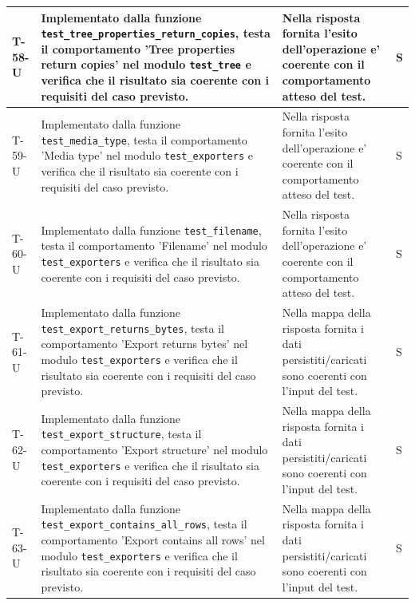 \documentclass[a4paper,12pt]{article}
\begin{document}
{{\begin{longtable}{|>{\RaggedRight\arraybackslash}p{1.55cm}|>{\RaggedRight\arraybackslash}p{8.0cm}|>{\RaggedRight\arraybackslash}p{4.6cm}|>{\RaggedRight\arraybackslash}p{1.2cm}|}
        \hline
        T-58-U & Implementato dalla funzione \texttt{test\_\allowbreak tree\_\allowbreak properties\_\allowbreak return\_\allowbreak copies}, testa il comportamento 'Tree properties return copies' nel modulo \texttt{test\_\allowbreak tree} e verifica che il risultato sia coerente con i requisiti del caso previsto. & Nella risposta fornita l'esito dell'operazione e' coerente con il comportamento atteso del test. & S \\
        \hline
        T-59-U & Implementato dalla funzione \texttt{test\_\allowbreak media\_\allowbreak type}, testa il comportamento 'Media type' nel modulo \texttt{test\_\allowbreak exporters} e verifica che il risultato sia coerente con i requisiti del caso previsto. & Nella risposta fornita l'esito dell'operazione e' coerente con il comportamento atteso del test. & S \\
        \hline
        T-60-U & Implementato dalla funzione \texttt{test\_\allowbreak filename}, testa il comportamento 'Filename' nel modulo \texttt{test\_\allowbreak exporters} e verifica che il risultato sia coerente con i requisiti del caso previsto. & Nella risposta fornita l'esito dell'operazione e' coerente con il comportamento atteso del test. & S \\
        \hline
        T-61-U & Implementato dalla funzione \texttt{test\_\allowbreak export\_\allowbreak returns\_\allowbreak bytes}, testa il comportamento 'Export returns bytes' nel modulo \texttt{test\_\allowbreak exporters} e verifica che il risultato sia coerente con i requisiti del caso previsto. & Nella mappa della risposta fornita i dati persistiti/caricati sono coerenti con l'input del test. & S \\
        \hline
        T-62-U & Implementato dalla funzione \texttt{test\_\allowbreak export\_\allowbreak structure}, testa il comportamento 'Export structure' nel modulo \texttt{test\_\allowbreak exporters} e verifica che il risultato sia coerente con i requisiti del caso previsto. & Nella mappa della risposta fornita i dati persistiti/caricati sono coerenti con l'input del test. & S \\
        \hline
        T-63-U & Implementato dalla funzione \texttt{test\_\allowbreak export\_\allowbreak contains\_\allowbreak all\_\allowbreak rows}, testa il comportamento 'Export contains all rows' nel modulo \texttt{test\_\allowbreak exporters} e verifica che il risultato sia coerente con i requisiti del caso previsto. & Nella mappa della risposta fornita i dati persistiti/caricati sono coerenti con l'input del test. & S \\

\end{longtable}}}
\end{document}

